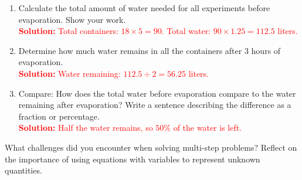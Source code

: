 \documentclass[12pt]{article}
\begin{document}
\begin{tcolorbox}[colframe=black!60, colback=white, 
coltitle=black, colbacktitle=black!15, fonttitle=\bfseries\Large, 
title=Performance Task: Designing a Water Conservation Experiment - Answer Key, halign title=center, left=10pt, right=10pt, top=10pt, bottom=50pt]
\begin{enumerate}[itemsep=3em]
    \item Calculate the total amount of water needed for all experiments before evaporation. Show your work.\\
    \textcolor{red}{\textbf{Solution:} 
    Total containers: \( 18 \times 5 = 90 \). 
    Total water: \( 90 \times 1.25 = 112.5 \) liters.}

    \item Determine how much water remains in all the containers after 3 hours of evaporation.\\
    \textcolor{red}{\textbf{Solution:} 
    Water remaining: \( 112.5 \div 2 = 56.25 \) liters.}

    \item Compare: How does the total water before evaporation compare to the water remaining after evaporation? Write a sentence describing the difference as a fraction or percentage.\\
    \textcolor{red}{\textbf{Solution:} 
    Half the water remains, so \( 50\% \) of the water is left.}
\end{enumerate}
\end{tcolorbox}

\vspace{1em}

\begin{tcolorbox}[colframe=black!60, colback=white, 
coltitle=black, colbacktitle=black!15, fonttitle=\bfseries\Large, 
title=Reflection, halign title=center, left=10pt, right=10pt, top=10pt, bottom=90pt]
What challenges did you encounter when solving multi-step problems? Reflect on the importance of using equations with variables to represent unknown quantities.
\end{tcolorbox}
\end{document}
